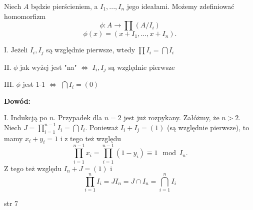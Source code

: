 Niech $A$ będzie pierścieniem, a $I_1,...,I_n$ jego ideałami. Możemy zdefiniować homomorfizm
$$\phi:A\to \prod(A/I_i)$$
$$\phi(x)=(x+I_1,...,x+I_n).$$


\indent I. Jeżeli $I_i,I_j$ są względnie pierwsze, wtedy $\prod I_i=\bigcap I_i$

\indent II. $\phi$ jak wyżej jest "na" $\iff$ $I_i, I_j$ są względnie pierwsze

\indent III. $\phi$ jest 1-1 $\iff$ $\bigcap I_i=(0)$

\textbf{Dowód:}

I. Indukcją po $n$. Przypadek dla $n=2$ jest już rozpykany. Załóżmy, że $n>2$. Niech $J=\prod_{i=1}^{n-1}I_i=\bigcap I_i$. Ponieważ $I_i+I_j=(1)$ (są względnie pierwsze), to mamy $x_i+y_i=1$ i z tego też względu
$$\prod\limits_{i=1}^{n-1}x_i=\prod\limits_{i=1}^{n-1}(1-y_i)\equiv 1\mod I_n.$$
Z tego też względu $I_n+J=(1)$ i
$$\prod\limits_{i=1}^nI_i=JI_n=J\cap I_n=\bigcap\limits_{i=1}^nI_i$$

str 7